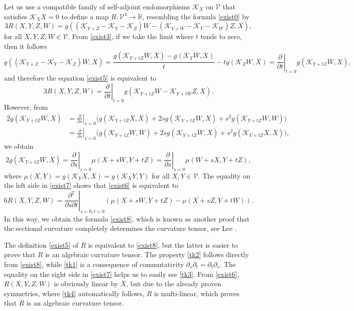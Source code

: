 \documentclass[preprint]{elsarticle}
\newcommand\mc{\mathcal}
\newcommand\mb{\mathbb}
\begin{document}
Let us use a compatible family of self-adjoint endomorphisms $\mc{K}_X$ on $\mc{V}$ that satisfies $\mc{K}_XX=0$ 
to define a map $R\colon \mc{V}^4\to\mb{R}$, resembling the formula \eqref{exist0} by
\begin{equation}\label{exist5}
3R(X,Y,Z,W)=g((\mc{K}_{Y+Z}-\mc{K}_{Y}-\mc{K}_{Z})W-(\mc{K}_{Y+W}-\mc{K}_{Y}-\mc{K}_{W})Z,X),
\end{equation} 
for all $X,Y,Z,W\in\mc{V}$.
From \eqref{exist3}, if we take the limit where $t$ tends to zero, then it follows
\begin{equation*}
g((\mc{K}_{Y+Z}-\mc{K}_{Y}-\mc{K}_{Z})W,X)=\frac{g(\mc{K}_{Y+tZ}W,X)-g(\mc{K}_{Y}W,X)}{t}-tg(\mc{K}_{Z}W,X)
=\left.\frac{\partial}{\partial t}\right|_{t=0}  g(\mc{K}_{Y+tZ}W,X),
\end{equation*}
and therefore the equation \eqref{exist5} is equivalent to 
\begin{equation}\label{exist6}
3R(X,Y,Z,W)= \left.\frac{\partial}{\partial t}\right|_{t=0}  g(\mc{K}_{Y+tZ}W-\mc{K}_{Y+tW}Z ,X).
\end{equation} 
However, from 
\begin{equation*}
\begin{aligned}
2g(\mc{K}_{Y+tZ}W,X)&=\left.\frac{\partial}{\partial s}\right|_{s=0}\Big( g(\mc{K}_{Y+tZ}X,X) +2sg(\mc{K}_{Y+tZ}W,X) + s^2g(\mc{K}_{Y+tZ}W,W) \Big)\\
&=\left.\frac{\partial}{\partial s}\right|_{s=0}\Big( g(\mc{K}_{Y+tZ}W,W) +2sg(\mc{K}_{Y+tZ}W,X) + s^2g(\mc{K}_{Y+tZ}X,X) \Big),
\end{aligned}
\end{equation*} 
we obtain
\begin{equation}\label{exist7}
2g(\mc{K}_{Y+tZ}W,X)=\left.\frac{\partial}{\partial s}\right|_{s=0}\mu(X+sW,Y+tZ)=\left.\frac{\partial}{\partial s}\right|_{s=0}\mu(W+sX,Y+tZ),
\end{equation} 
where $\mu(X,Y)=g(\mc{K}_YX,X)=g(\mc{K}_XY,Y)$ for all $X,Y\in\mc{V}$.
The equality on the left side in \eqref{exist7} shows that \eqref{exist6} is equivalent to
\begin{equation}\label{exist8}
6R(X,Y,Z,W)= \left.\frac{\partial^2}{\partial s \partial t}\right|_{s=0,t=0}(\mu(X+sW,Y+tZ) -\mu(X+sZ,Y+tW)).
\end{equation} 
In this way, we obtain the formula \eqref{exist8}, which is known as another proof that the sectional curvature
completely determines the curvature tensor, see Lee \cite[Proposition 13.27]{Lej}.

The definition \eqref{exist5} of $R$ is equivalent to \eqref{exist8}, but the latter is easier to prove that $R$
is an algebraic curvature tensor. 
The property \eqref{tk2} follows directly from \eqref{exist8}, while \eqref{tk1} is a consequence of 
commutativity $\partial_s\partial_t=\partial_t\partial_s$. The equality on the right side in \eqref{exist7}
helps us to easily see \eqref{tk3}.
From \eqref{exist6}, $R(X,Y,Z,W)$ is obviously linear by $X$, but due to the already proven symmetries, 
where \eqref{tk4} automatically follows, $R$ is multi-linear, which proves that $R$ is an algebraic curvature tensor.
\end{document}
